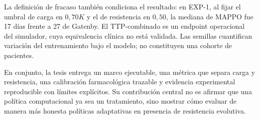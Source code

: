 La definición de fracaso también condiciona el resultado: en EXP-1, al fijar el umbral de carga en $0{,}70K$ y el de resistencia en $0{,}50$, la mediana de MAPPO fue 17 días frente a 27 de Gatenby. El TTP-combinado es un endpoint operacional del simulador, cuya equivalencia clínica no está validada. Las semillas cuantifican variación del entrenamiento bajo el modelo; no constituyen una cohorte de pacientes.

En conjunto, la tesis entrega un marco ejecutable, una métrica que separa carga y resistencia, una calibración farmacológica trazable y evidencia experimental reproducible con límites explícitos. Su contribución central no es afirmar que una política computacional ya sea un tratamiento, sino mostrar cómo evaluar de manera más honesta políticas adaptativas en presencia de resistencia evolutiva.
